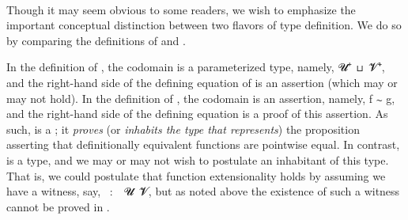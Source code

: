 \scpad
\begin{code}%
\>[1]\AgdaSpace{}%
\AgdaSymbol{:}\AgdaSpace{}%
\AgdaSymbol{\{}\AgdaSpace{}%
\AgdaSymbol{:}\AgdaSpace{}%
\AgdaSpace{}%
\AgdaSpace{}%
\AgdaSymbol{\}\{}\AgdaSpace{}%
\AgdaSymbol{:}\AgdaSpace{}%
\AgdaSpace{}%
\AgdaSpace{}%
\AgdaSpace{}%
\AgdaSpace{}%
\AgdaSymbol{\}(}\AgdaSpace{}%
\AgdaSpace{}%
\AgdaSymbol{:}\AgdaSpace{}%
\AgdaSpace{}%
\AgdaSymbol{)}\AgdaSpace{}%
\AgdaSpace{}%
\AgdaSpace{}%
\AgdaSpace{}%
\AgdaSpace{}%
\AgdaSpace{}%
\AgdaSpace{}%
\AgdaSpace{}%
\<%
\\
%
\>[1]\AgdaSpace{}%
\AgdaSymbol{\AgdaUnderscore{}}\AgdaSpace{}%
\AgdaSymbol{\AgdaUnderscore{}}\AgdaSpace{}%
\AgdaSpace{}%
\AgdaSymbol{\AgdaUnderscore{}}\AgdaSpace{}%
\AgdaSymbol{=}\AgdaSpace{}%
\<%
\end{code}
\scpad

Though it may seem obvious to some readers, we wish to emphasize the important conceptual distinction between two flavors of type definition.  We do so by comparing the definitions of  and .

In the definition of , the codomain is a parameterized type, namely, \ab 𝓤\af ⁺~\apr ⊔~\ab 𝓥\af ⁺\af ̇, and the right-hand side of the defining equation of  is an assertion (which may or may not hold). In the definition of , the codomain is an assertion, namely, \ab f \af ∼ \ab g, and the right-hand side of the defining equation is a proof of this assertion. As such,  is a ; it \emph{proves} (or \emph{inhabits the type that represents}) the proposition asserting that definitionally equivalent functions are pointwise equal. In contrast,  is a type, and we may or may not wish to postulate an inhabitant of this type. That is, we could postulate that function extensionality holds by assuming we have a witness, say, ~\as :~~\ab 𝓤~\ab 𝓥, but as noted above the existence of such a witness cannot be proved in \mltt.

